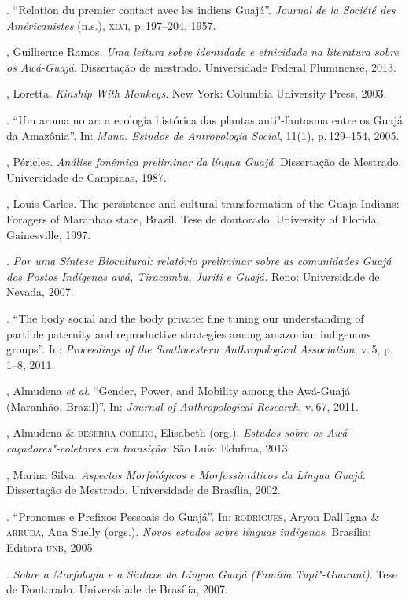\begin{bibliohedra}
\titidem. ``Relation du premier contact avec les indiens
Guajá''. \emph{Journal de la Société des Américanistes} (n.s.), \textsc{xlvi}, p.\,197--204, 1957.

, Guilherme Ramos. \emph{Uma leitura sobre identidade e
etnicidade na literatura sobre os Awá-Guajá}. Dissertação de mestrado.
Universidade Federal Fluminense, 2013.

, Loretta. \emph{Kinship With Monkeys}. New York: Columbia
University Press, 2003.

\titidem. ``Um aroma no ar: a ecologia histórica das
plantas anti"-fantasma entre os Guajá da Amazônia''. In: \emph{Mana.
Estudos de Antropologia Social}, 11(1), p.\,129--154, 2005.

, Péricles. \emph{Análise fonêmica preliminar da língua
Guajá}. Dissertação de Mestrado. Universidade de Campinas, 1987.

, Louis Carlos. The persistence and cultural transformation
of the Guaja Indians: Foragers of Maranhao state, Brazil. Tese de
doutorado. University of Florida, Gainesville, 1997.

\titidem. \emph{Por uma Síntese Biocultural:
relatório preliminar sobre as comunidades Guajá dos Postos Indígenas
awá, Tiracambu, Juriti e Guajá.} Reno: Universidade de Nevada, 2007.

\titidem. ``The body social and the body private: fine
tuning our understanding of partible paternity and reproductive
strategies among amazonian indigenous groups''. In: \emph{Proceedings of
the Southwestern Anthropological Association}, v.\,5, p.\,1--8, 2011.

, Almudena \emph{et al}. ``Gender, Power, and Mobility among the Awá-Guajá
(Maranhão, Brazil)''. In: \emph{Journal of Anthropological Research}, v.\,67, 2011.

, Almudena \& \textsc{beserra coelho}, Elisabeth (org.).
\emph{Estudos sobre os Awá -- caçadores"-coletores em transição.} São
Luís: Edufma, 2013.

, Marina Silva. \emph{Aspectos Morfológicos e
Morfossintáticos da Língua Guajá}. Dissertação de Mestrado. Universidade
de Brasília, 2002.

\titidem. ``Pronomes e Prefixos Pessoais do Guajá''. In: \textsc{rodrigues}, Aryon Dall'Igna \& \textsc{arruda}, Ana Suelly (orgs.).
\emph{Novos estudos sobre línguas indígenas}. Brasília: Editora \textsc{unb}, 2005.

\titidem. \emph{Sobre a Morfologia e a Sintaxe da
Língua Guajá (Família Tupi"-Guarani)}. Tese de Doutorado. Universidade de
Brasília, 2007.


\end{bibliohedra}
